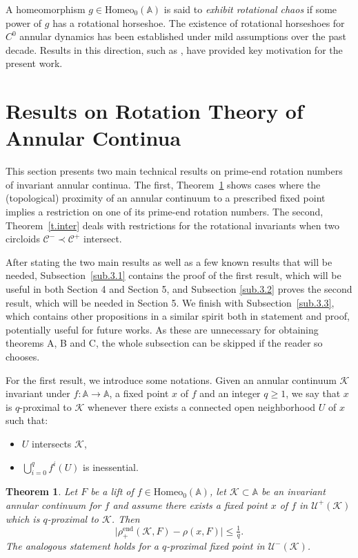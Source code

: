\documentclass[12pt,a4paper]{amsart}
\newtheorem{thm}{Theorem}[section]
\theoremstyle{definition}
\theoremstyle{remark}
\newcommand{\A}{\mathbb{A}}
\begin{document}
A homeomorphism $g \in\mathrm{Homeo}_0(\A)$ is said to \emph{exhibit rotational chaos} if some power of $g$ has a rotational horseshoe.
The existence of rotational horseshoes for $C^0$ annular dynamics has been established under mild assumptions
over the past decade. Results in this direction, such as \cite{paposa, lecalveztal}, have provided key motivation for the present work. 
%
\section{Results on Rotation Theory of Annular Continua}\label{s.techresult}

This section presents two main technical results on prime-end rotation numbers of invariant annular continua. The first, Theorem~\ref{t.proximal} shows cases where the (topological) proximity of an annular continuum to a prescribed fixed point implies a restriction on one of its prime-end rotation numbers. The second, Theorem~\ref{t.inter} deals with restrictions for the rotational invariants when two circloids $\mathcal{C}^-\prec\mathcal{C}^+$ intersect. 

After stating the two main results as well as a few known results that will be needed,  Subsection~\ref{sub.3.1} contains the proof of the first result, which will be useful in both Section 4 and Section 5, and Subsection \ref{sub.3.2} proves the second result, which will be needed in Section 5. We finish with Subsection~\ref{sub.3.3}, which contains other propositions in a similar spirit both in statement and proof,  potentially useful for future works. As these  are unnecessary for obtaining theorems A, B and C, the whole subsection can be skipped if the reader so chooses. 

For the first result, we introduce some notations. Given an annular continuum $\mathcal{K}$ invariant under
$f:\A\to\A$, a fixed point $x$ of $f$ and an integer $q\ge 1$, we say that $x$ is $q$-proximal to $\mathcal{K}$ whenever there exists a connected open neighborhood $U$ of $x$ such that:
\begin{itemize}
\item  $U$ intersects $\mathcal{K}$,
\item $\bigcup_{i=0}^{q}f^{i}(U)$ is inessential.
\end{itemize}

\begin{thm}\label{t.proximal}
Let $F$ be a lift of $f\in\mathrm{Homeo}_0(\A)$, let $\mathcal{K}\subset\A$ be an invariant annular continuum for $f$ and assume there exists a fixed point $x$ of $f$ in $\mathcal{U}^{+}(\mathcal{K})$ which is $q$-proximal to $\mathcal{K}$.
Then 
\[
\mid \rho_+^{\mathrm{end}}(\mathcal{K},F)-\rho(x,F)\mid \leq\tfrac{1}{q}.
\]
The analogous statement holds for a $q$-proximal fixed point in $\mathcal{U}^{-}(\mathcal{K})$.
\end{thm}
\end{document}
